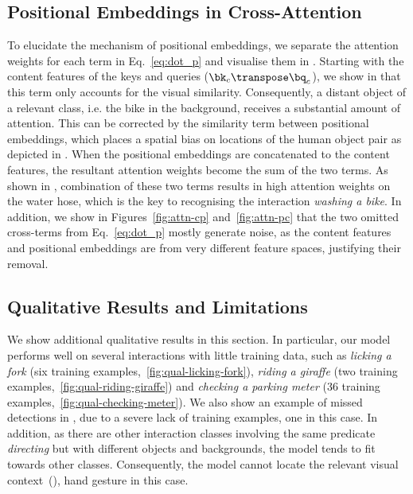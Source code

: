 \documentclass[10pt,twocolumn,letterpaper]{article}
\begin{document}
\subsection{Positional Embeddings in Cross-Attention}

To elucidate the mechanism of positional embeddings, we separate the attention weights for each term in Eq.~\ref{eq:dot_p} and visualise them in . Starting with the content features of the keys and queries ($\bk_c\transpose \bq_c$), we show in  that this term only accounts for the visual similarity. Consequently, a distant object of a relevant class, i.e. the bike in the background, receives a substantial amount of attention. This can be corrected by the similarity term between positional embeddings, which places a spatial bias on locations of the human object pair as depicted in . When the positional embeddings are concatenated to the content features, the resultant attention weights become the sum of the two terms. As shown in , combination of these two terms results in high attention weights on the water hose, which is the key to recognising the interaction \textit{washing a bike}. In addition, we show in Figures~\ref{fig:attn-cp} and~\ref{fig:attn-pc} that the two omitted cross-terms from Eq.~\ref{eq:dot_p} mostly generate noise, as the content features and positional embeddings are from very different feature spaces, justifying their removal.

\subsection{Qualitative Results and Limitations}

We show additional qualitative results in this section. In particular, our model performs well on several interactions with little training data, such as \textit{licking a fork} (six training examples,~\ref{fig:qual-licking-fork}), \textit{riding a giraffe} (two training examples,~\ref{fig:qual-riding-giraffe}) and \textit{checking a parking meter} (36 training examples,~\ref{fig:qual-checking-meter}). We also show an example of missed detections in , due to a severe lack of training examples, one in this case. In addition, as there are other interaction classes involving the same predicate \textit{directing} but with different objects and backgrounds, the model tends to fit towards other classes. Consequently, the model cannot locate the relevant visual context~(), hand gesture in this case.
\end{document}
